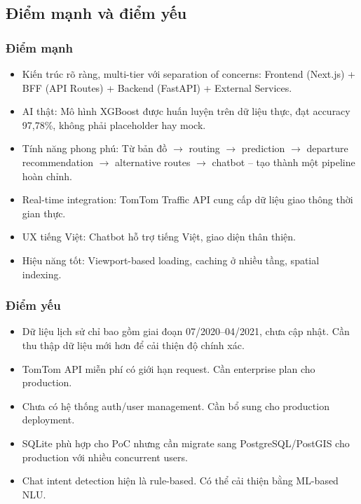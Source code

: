 \documentclass[12pt,a4paper]{article}
\begin{document}
\subsection{Điểm mạnh và điểm yếu}

\subsubsection{Điểm mạnh}
\begin{itemize}[leftmargin=1.2cm]
    \item Kiến trúc rõ ràng, multi-tier với separation of concerns: Frontend (Next.js) + BFF (API Routes) + Backend (FastAPI) + External Services.
    \item AI thật: Mô hình XGBoost được huấn luyện trên dữ liệu thực, đạt accuracy 97,78\%, không phải placeholder hay mock.
    \item Tính năng phong phú: Từ bản đồ $\rightarrow$ routing $\rightarrow$ prediction $\rightarrow$ departure recommendation $\rightarrow$ alternative routes $\rightarrow$ chatbot -- tạo thành một pipeline hoàn chỉnh.
    \item Real-time integration: TomTom Traffic API cung cấp dữ liệu giao thông thời gian thực.
    \item UX tiếng Việt: Chatbot hỗ trợ tiếng Việt, giao diện thân thiện.
    \item Hiệu năng tốt: Viewport-based loading, caching ở nhiều tầng, spatial indexing.
\end{itemize}

\subsubsection{Điểm yếu}
\begin{itemize}[leftmargin=1.2cm]
    \item Dữ liệu lịch sử chỉ bao gồm giai đoạn 07/2020--04/2021, chưa cập nhật. Cần thu thập dữ liệu mới hơn để cải thiện độ chính xác.
    \item TomTom API miễn phí có giới hạn request. Cần enterprise plan cho production.
    \item Chưa có hệ thống auth/user management. Cần bổ sung cho production deployment.
    \item SQLite phù hợp cho PoC nhưng cần migrate sang PostgreSQL/PostGIS cho production với nhiều concurrent users.
    \item Chat intent detection hiện là rule-based. Có thể cải thiện bằng ML-based NLU.
\end{itemize}
\end{document}
